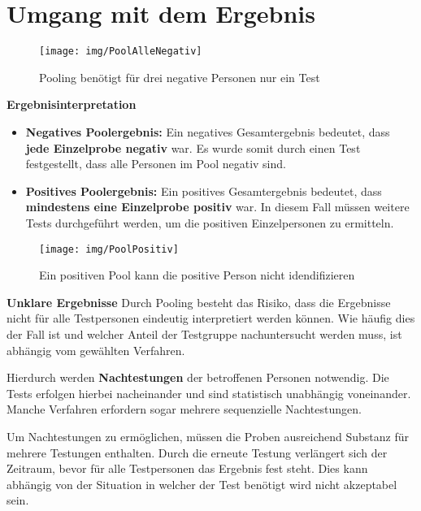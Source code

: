 \section{Umgang mit dem Ergebnis}
\begin{wrapfigure}{r}{0.4\textwidth}
	\texttt{[image: img/PoolAlleNegativ]}
	\caption{Pooling benötigt für drei negative Personen nur ein Test}
\end{wrapfigure}
\textbf{Ergebnisinterpretation}
\begin{itemize}
	\item \textbf{Negatives Poolergebnis:}\newline
	Ein negatives Gesamtergebnis bedeutet, dass \textbf{jede Einzelprobe negativ} war.
	Es wurde somit durch einen Test festgestellt, dass alle Personen im Pool negativ sind.
		
	\item \textbf{Positives Poolergebnis:}\newline
	Ein positives Gesamtergebnis bedeutet, dass \textbf{mindestens eine Einzelprobe positiv} war.
	In diesem Fall müssen weitere Tests durchgeführt werden, um die positiven Einzelpersonen zu ermitteln.

\end{itemize}

\begin{wrapfigure}{r}{0.4\textwidth}
	\texttt{[image: img/PoolPositiv]}
	\caption{Ein positiven Pool kann die positive Person nicht idendifizieren}
\end{wrapfigure}
\textbf{Unklare Ergebnisse}\newline
Durch Pooling besteht das Risiko, dass die Ergebnisse nicht für alle Testpersonen eindeutig interpretiert werden können.
Wie häufig dies der Fall ist und welcher Anteil der Testgruppe nachuntersucht werden muss, ist abhängig vom gewählten Verfahren.

Hierdurch werden \textbf{Nachtestungen} der betroffenen Personen notwendig.
Die Tests erfolgen hierbei nacheinander und sind statistisch unabhängig voneinander.
Manche Verfahren erfordern sogar mehrere sequenzielle Nachtestungen.

Um Nachtestungen zu ermöglichen, müssen die Proben ausreichend Substanz für mehrere Testungen enthalten.
Durch die erneute Testung verlängert sich der Zeitraum, bevor für alle Testpersonen das Ergebnis fest steht.
Dies kann abhängig von der Situation in welcher der Test benötigt wird nicht akzeptabel sein.

